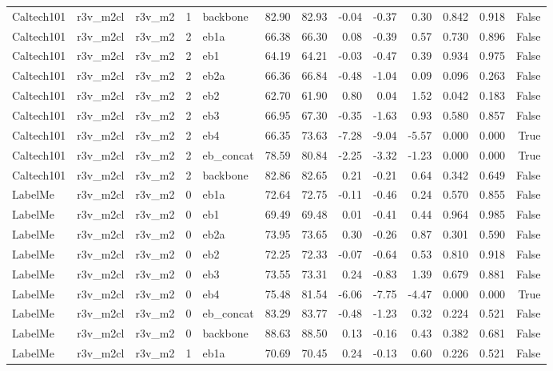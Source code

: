\begin{table}
\begin{tabular}{lllrlrrrrrllr}
Caltech101 & r3v\_m2cl & r3v\_m2 & 1 & backbone & 82.90 & 82.93 & -0.04 & -0.37 & 0.30 & 0.842 & 0.918 & False \\
Caltech101 & r3v\_m2cl & r3v\_m2 & 2 & eb1a & 66.38 & 66.30 & 0.08 & -0.39 & 0.57 & 0.730 & 0.896 & False \\
Caltech101 & r3v\_m2cl & r3v\_m2 & 2 & eb1 & 64.19 & 64.21 & -0.03 & -0.47 & 0.39 & 0.934 & 0.975 & False \\
Caltech101 & r3v\_m2cl & r3v\_m2 & 2 & eb2a & 66.36 & 66.84 & -0.48 & -1.04 & 0.09 & 0.096 & 0.263 & False \\
Caltech101 & r3v\_m2cl & r3v\_m2 & 2 & eb2 & 62.70 & 61.90 & 0.80 & 0.04 & 1.52 & 0.042 & 0.183 & False \\
Caltech101 & r3v\_m2cl & r3v\_m2 & 2 & eb3 & 66.95 & 67.30 & -0.35 & -1.63 & 0.93 & 0.580 & 0.857 & False \\
Caltech101 & r3v\_m2cl & r3v\_m2 & 2 & eb4 & 66.35 & 73.63 & -7.28 & -9.04 & -5.57 & 0.000 & 0.000 & True \\
Caltech101 & r3v\_m2cl & r3v\_m2 & 2 & eb\_concat & 78.59 & 80.84 & -2.25 & -3.32 & -1.23 & 0.000 & 0.000 & True \\
Caltech101 & r3v\_m2cl & r3v\_m2 & 2 & backbone & 82.86 & 82.65 & 0.21 & -0.21 & 0.64 & 0.342 & 0.649 & False \\
LabelMe & r3v\_m2cl & r3v\_m2 & 0 & eb1a & 72.64 & 72.75 & -0.11 & -0.46 & 0.24 & 0.570 & 0.855 & False \\
LabelMe & r3v\_m2cl & r3v\_m2 & 0 & eb1 & 69.49 & 69.48 & 0.01 & -0.41 & 0.44 & 0.964 & 0.985 & False \\
LabelMe & r3v\_m2cl & r3v\_m2 & 0 & eb2a & 73.95 & 73.65 & 0.30 & -0.26 & 0.87 & 0.301 & 0.590 & False \\
LabelMe & r3v\_m2cl & r3v\_m2 & 0 & eb2 & 72.25 & 72.33 & -0.07 & -0.64 & 0.53 & 0.810 & 0.918 & False \\
LabelMe & r3v\_m2cl & r3v\_m2 & 0 & eb3 & 73.55 & 73.31 & 0.24 & -0.83 & 1.39 & 0.679 & 0.881 & False \\
LabelMe & r3v\_m2cl & r3v\_m2 & 0 & eb4 & 75.48 & 81.54 & -6.06 & -7.75 & -4.47 & 0.000 & 0.000 & True \\
LabelMe & r3v\_m2cl & r3v\_m2 & 0 & eb\_concat & 83.29 & 83.77 & -0.48 & -1.23 & 0.32 & 0.224 & 0.521 & False \\
LabelMe & r3v\_m2cl & r3v\_m2 & 0 & backbone & 88.63 & 88.50 & 0.13 & -0.16 & 0.43 & 0.382 & 0.681 & False \\
LabelMe & r3v\_m2cl & r3v\_m2 & 1 & eb1a & 70.69 & 70.45 & 0.24 & -0.13 & 0.60 & 0.226 & 0.521 & False \\

\end{tabular}
\end{table}
